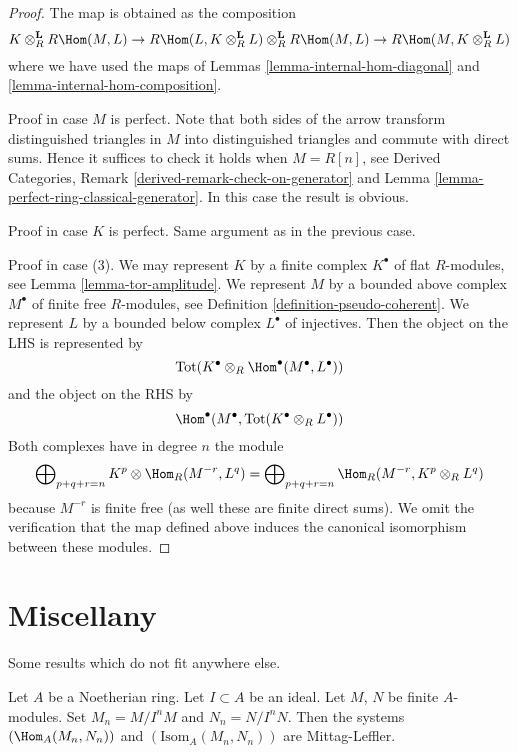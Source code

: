 \begin{proof}
The map is obtained as the composition
$$
K \otimes_R^\mathbf{L} R\Hom(M, L) \to
R\Hom(L, K \otimes_R^\mathbf{L} L) \otimes_R^\mathbf{L} R\Hom(M, L) \to
R\Hom(M, K \otimes_R^\mathbf{L} L)
$$
where we have used the maps of Lemmas \ref{lemma-internal-hom-diagonal} and
\ref{lemma-internal-hom-composition}.

\medskip\noindent
Proof in case $M$ is perfect. Note that both sides of the arrow
transform distinguished triangles in $M$ into distinguished triangles
and commute with direct sums. Hence it suffices to check
it holds when $M = R[n]$, see
Derived Categories, Remark \ref{derived-remark-check-on-generator}
and Lemma \ref{lemma-perfect-ring-classical-generator}.
In this case the result is obvious.

\medskip\noindent
Proof in case $K$ is perfect. Same argument as in the previous case.

\medskip\noindent
Proof in case (3). We may represent $K$ by a finite complex
$K^\bullet$ of flat $R$-modules, see Lemma \ref{lemma-tor-amplitude}.
We represent $M$ by a bounded above complex $M^\bullet$
of finite free $R$-modules, see Definition \ref{definition-pseudo-coherent}.
We represent $L$ by a bounded below complex $L^\bullet$ of injectives.
Then the object on the LHS is represented by
$$
\text{Tot}(K^\bullet \otimes_R \Hom^\bullet(M^\bullet, L^\bullet))
$$
and the object on the RHS by
$$
\Hom^\bullet(M^\bullet, \text{Tot}(K^\bullet \otimes_R L^\bullet))
$$
Both complexes have in degree $n$ the module
$$
\bigoplus\nolimits_{p + q + r = n} K^p \otimes \Hom_R(M^{-r}, L^q) =
\bigoplus\nolimits_{p + q + r = n} \Hom_R(M^{-r}, K^p \otimes_R L^q)
$$
because $M^{-r}$ is finite free
(as well these are finite direct sums).
We omit the verification that the map defined above
induces the canonical isomorphism between these modules.
\end{proof}







\section{Miscellany}
\label{section-misc}

\noindent
Some results which do not fit anywhere else.

\begin{lemma}
\label{lemma-hom-systems-ML}
Let $A$ be a Noetherian ring. Let $I \subset A$ be an ideal. Let $M$, $N$ be
finite $A$-modules. Set $M_n = M/I^nM$ and $N_n = N/I^nN$. Then
the systems $(\Hom_A(M_n, N_n))$ and $(\text{Isom}_A(M_n, N_n))$
are Mittag-Leffler.
\end{lemma}

